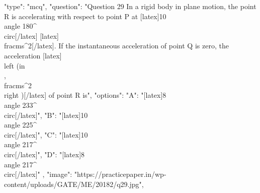   {
    "type": "mcq",
    "question": "Question 29 In a rigid body in plane motion, the point R is accelerating with respect to point P at [latex]10\\angle 180^{\\circ}[/latex] [latex]\\frac{m}{s^{2}}[/latex]. If the instantaneous acceleration of point Q is zero, the acceleration [latex]\\left (in \\, \\frac{m}{s^{2}} \\right )[/latex] of point R is",
    "options": {
      "A": "[latex]8\\angle 233^{\\circ}[/latex]",
      "B": "[latex]10\\angle 225^{\\circ}[/latex]",
      "C": "[latex]10\\angle 217^{\\circ}[/latex]",
      "D": "[latex]8\\angle 217^{\\circ}[/latex]"
    },
    "image": "https://practicepaper.in/wp-content/uploads/GATE/ME/20182/q29.jpg",
}
